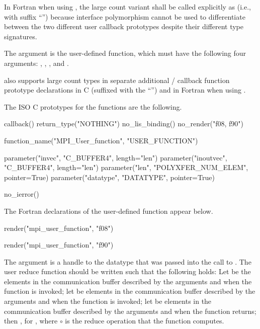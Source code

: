 In Fortran when using , the large count variant shall
be called explicitly as  (i.e., with suffix ``'')
because interface polymorphism cannot be used to differentiate between the
two different user callback prototypes despite their different type
signatures.

The argument  is the user-defined function, which must have the
following four arguments: , , , and
.

 also supports large count types in
separate additional \MPI/ callback function prototype declarations in C (suffixed with the ``'') and
in Fortran when using .

The ISO C prototypes for the functions are the following.

\begin{mpi-binding}
    callback()
    return_type("NOTHING")
    no_lis_binding()
    no_render("f08, f90")

    function_name("MPI_User_function", "USER_FUNCTION")

    parameter("invec", "C_BUFFER4", length="len")
    parameter("inoutvec", "C_BUFFER4", length="len")
    parameter("len", "POLYXFER_NUM_ELEM", pointer=True)
    parameter("datatype", "DATATYPE", pointer=True)

    no_ierror()
\end{mpi-binding}

The Fortran declarations of the user-defined function  appear
below.

\begin{mpi-binding}
    render("mpi_user_function", "f08")
\end{mpi-binding}
\begin{mpi-binding}
    render("mpi_user_function", "f90")
\end{mpi-binding}

The  argument
is a handle to the datatype that was passed into the call
to .
The user reduce function should be written such that the following
holds:
Let  be the  elements in the
communication buffer described by the arguments 
and  when the function is invoked;
let  be  elements in the
communication buffer described by the arguments 
and  when the function is invoked;
let  be   elements in the
communication buffer described by the arguments 
and  when the function returns;
then , for ,
where $\circ$ is the reduce operation that the function computes.

